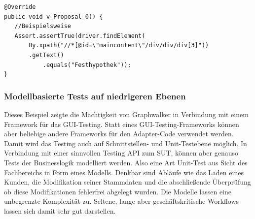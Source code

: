 \begin{lstlisting}[caption={Auf einer Kante wird mittels Selenium eine Eingabe und ein Klick durchgeführt.}, label=lst:SeleniumImexAssertion]
@Override
public void v_Proposal_0() {
   //Beispielsweise
   Assert.assertTrue(driver.findElement(
	   By.xpath("//*[@id=\"maincontent\"/div/div/div[3]"))
	   .getText()
           .equals("Festhypothek"));
}
\end{lstlisting}

\subsubsection{Modellbasierte Tests auf niedrigeren Ebenen} Dieses Beispiel zeigte die Mächtigkeit von Graphwalker in Verbindung mit einem Framework für das GUI-Testing. Statt eines GUI-Testing-Frameworks können aber beliebige andere Frameworks für den Adapter-Code verwendet werden. Damit wird das Testing auch auf Schnittstellen- und Unit-Testebene möglich. In Verbindung mit einer sinnvollen Testing API zum SUT, können aber genauso Tests der Businesslogik modelliert werden. Also eine Art Unit-Test aus Sicht des Fachbereichs in Form eines Modells. Denkbar sind Abläufe wie das Laden eines Kunden, die Modifikation seiner Stammdaten und die abschließende Überprüfung ob diese Modifikationen fehlerfrei abgelegt wurden. Die Modelle lassen eine unbegrenzte Komplexität zu. Seltene, lange aber geschäftskritische Workflows lassen sich damit sehr gut darstellen.

